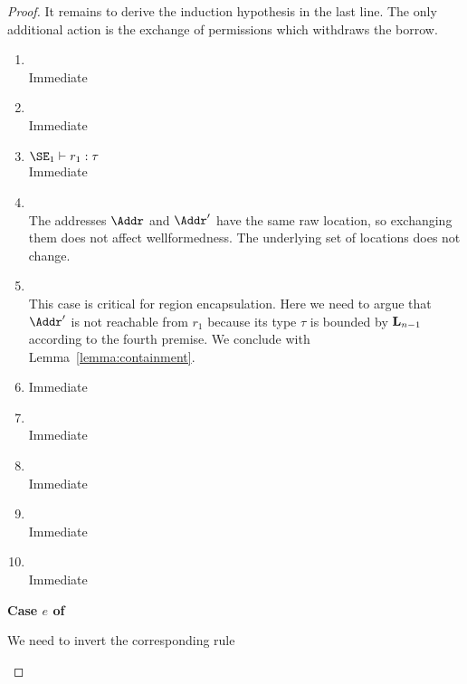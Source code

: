 \begin{proof}
  It remains to derive the induction hypothesis in the last line. The
  only additional action is the exchange of permissions which
  withdraws the borrow.
  \begin{enumerate}[({R}1)]
  \item {}\\
    Immediate
  \item {}\\
    Immediate
  \item $\SE_1 \vdash r_1 : \tau$\\
    Immediate
  \item {} \\
    The addresses $\Addr$ and $\Addr'$ have the same raw location, so
    exchanging them does not affect wellformedness. The underlying set
    of locations does not change.
  \item {} \\
    This case is critical for region encapsulation. Here we need to
    argue that $\Addr'$ is not reachable from $r_1$ because its type
    $\tau$ is bounded by $\klin_{n-1}$ according to the fourth
    premise. We conclude with Lemma~\ref{lemma:containment}.
  \item {}
    Immediate
  \item {} \\
    Immediate
  \item {} \\
    Immediate
  \item {} \\
    Immediate
  \item {} \\
    Immediate
  \end{enumerate}

  \newpage{}
  \textbf{Case $e$ of}

  We need to invert the corresponding rule
  \begin{mathpar}
  \end{mathpar}


\end{proof}
